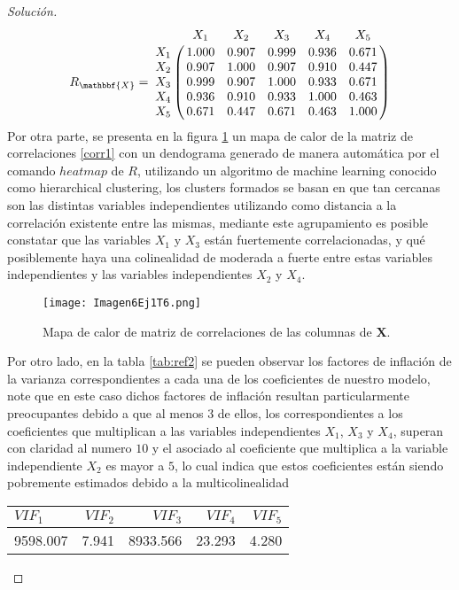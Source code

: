 \documentclass[10.5pt,notitlepage]{article}
\newenvironment{solucion}
  {\begin{proof}[Solución]}
  {\end{proof}}
\theoremstyle{plain}
\begin{document}
\begin{solucion}
\begin{equation}\label{corr1}
R_{\mathbbf{X}} = \bordermatrix{
   & X_1   & X_2  &  X_3   & X_4&X_5\cr
X_1& 1.000& 0.907& 0.999& 0.936 &0.671\cr
X_2& 0.907& 1.000& 0.907& 0.910 &0.447\cr
X_3& 0.999& 0.907& 1.000& 0.933 &0.671\cr
X_4& 0.936& 0.910& 0.933& 1.000 &0.463\cr
X_5& 0.671& 0.447& 0.671& 0.463 &1.000
  }
\end{equation}
Por otra parte, se presenta en la figura \ref{fig:6} un mapa de calor de la matriz de correlaciones \eqref{corr1} con un dendograma generado de manera automática por el comando \(heatmap\) de \(R\), utilizando un algoritmo de machine learning conocido como hierarchical clustering, los clusters formados se basan en que tan cercanas son las distintas variables independientes utilizando como distancia a la correlación existente entre las mismas, mediante este agrupamiento es posible constatar que las variables \(X_1\) y \(X_3\) están fuertemente correlacionadas, y qué posiblemente haya una colinealidad de moderada a fuerte entre estas variables independientes y las variables independientes \(X_2\) y \(X_4\).
\begin{figure}[htb]
 \centering
 \texttt{[image: Imagen6Ej1T6.png]}
 \caption{Mapa de calor de matriz de correlaciones de las columnas de \(\mathbf{X}\).}
\label{fig:6}
\end{figure}
Por otro lado, en la tabla \ref{tab:ref2} se pueden observar los factores de inflación de la varianza correspondientes a cada una de los coeficientes de nuestro modelo, note que en este caso dichos factores de inflación resultan particularmente preocupantes debido a que al menos \(3\) de ellos, los correspondientes a los coeficientes que multiplican a las variables independientes \(X_1\), \(X_3\) y \(X_4\), superan con claridad al numero \(10\) y el asociado al coeficiente que multiplica a la variable independiente \(X_2\) es mayor a \(5\), lo cual indica que estos coeficientes están siendo pobremente estimados debido a la multicolinealidad 
\begin{table}[H]
        \centering
        \begin{tabular}{@{}l@{\hskip 0.3in}r@{\hskip 0.3in}r@{\hskip 0.3in}r@{\hskip 0.3in}r@{}}
            \toprule
            \(VIF_1\)& \(VIF_2\) & \(VIF_3\)& \(VIF_4\)& \(VIF_5\) \\
            \midrule
             9598.007& 7.941 &8933.566  & 23.293&    4.280\\  
            \bottomrule
        \end{tabular}

\end{table}
\end{solucion}
\end{document}
